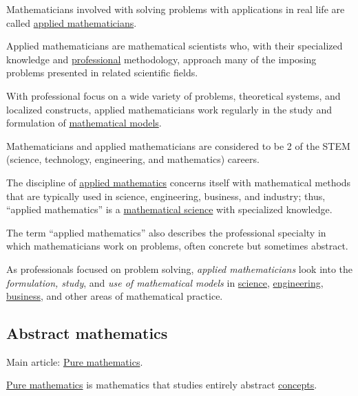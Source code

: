 \documentclass{book}
\numberwithin{equation}{section}
\begin{document}
%
Mathematicians involved with solving problems with applications in real life are called \href{https://en.wikipedia.org/wiki/Applied_mathematician}{applied mathematicians}.

Applied mathematicians are mathematical scientists who, with their specialized knowledge and \href{https://en.wikipedia.org/wiki/Professional}{professional} methodology, approach many of the imposing problems presented in related scientific fields.

With professional focus on a wide variety of problems, theoretical systems, and localized constructs, applied mathematicians work regularly in the study and formulation of \href{https://en.wikipedia.org/wiki/Mathematical_models}{mathematical models}.

Mathematicians and applied mathematicians are considered to be 2 of the STEM (science, technology, engineering, and mathematics) careers.

%
The discipline of \href{https://en.wikipedia.org/wiki/Applied_mathematics}{applied mathematics} concerns itself with mathematical methods that are typically used in science, engineering, business, and industry; thus, ``applied mathematics'' is a \href{https://en.wikipedia.org/wiki/Mathematical_science}{mathematical science} with specialized knowledge.

The term ``applied mathematics'' also describes the professional specialty in which mathematicians work on problems, often concrete but sometimes abstract.

As professionals focused on problem solving, \textit{applied mathematicians} look into the \textit{formulation, study}, and \textit{use of mathematical models} in \href{https://en.wikipedia.org/wiki/Science}{science}, \href{https://en.wikipedia.org/wiki/Engineering}{engineering}, \href{https://en.wikipedia.org/wiki/Business}{business}, and other areas of mathematical practice.

\subsection{Abstract mathematics}
Main article: \href{https://en.wikipedia.org/wiki/Pure_mathematics}{Pure mathematics}.

%
\href{https://en.wikipedia.org/wiki/Pure_mathematics}{Pure mathematics} is mathematics that studies entirely abstract \href{https://en.wikipedia.org/wiki/Concept}{concepts}.
\end{document}
